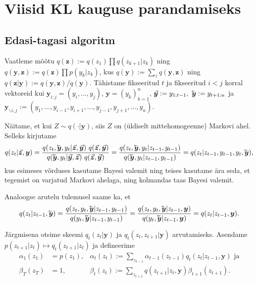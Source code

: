 
\section{Viisid KL kauguse parandamiseks}

\bla

\subsection{Edasi-tagasi algoritm}
\label{chapter:forw_back}

Vaatleme mõõtu $q(\bm{z}) := q(z_1) \prod q(z_{k+1} | z_k)$ ning $q(\bm{y},\bm{z}) := q(\bm{z}) \prod p(y_k | z_k)$, kus $q(\bm{y}) := \sum_{z} q(\bm{y},\bm{z})$ ning $q(\bm{z}|\bm{y}) := q(\bm{y},\bm{z})/q(\bm{y})$. Tähistame fikseeritud $t$ ja fikseeritud $i < j$ korral vektoreid kui $\bm{y}_{i:j} = (y_i,\ldots,y_j)$, $\bm{y} = (y_k)_{k=1}^n$, $\vec{\bm{y}} := y_{1:t-1},\ \cev{\bm{y}} := y_{t+1:n}$ ja $ \bm{y}_{\backslash i, j} := (y_1,\ldots,y_{i-1},y_{i+1},\ldots,y_{j-1},y_{j+1},\ldots,y_n)$.

Näitame, et kui $Z \sim q(\cdot | \bm{y})$, siis $Z$ on (üldiselt mittehomogeenne) Markovi ahel. Selleks kirjutame
$$q(z_{t} | \vec{\bm{z}}, \bm{y}) = \frac{q(z_t, \cev{\bm{y}}, y_t | \vec{\bm{z}}, \vec{\bm{y}}) \ q(\vec{\bm{z}}, \vec{\bm{y}})}{q(\cev{\bm{y}}, y_t | \vec{\bm{y}}, \vec{\bm{z}}) \ q(\vec{\bm{z}}, \vec{\bm{y}})} = \frac{q(z_t, \cev{\bm{y}}, y_t | z_{t-1}, y_{t-1})}{q(\cev{\bm{y}}, y_t | z_{t-1}, y_{t-1})} = q(z_t | z_{t-1}, y_{t-1},y_t, \cev{\bm{y}}),
$$
kus esimeses võrduses kasutame Bayesi valemit ning teises kasutame ära seda, et tegemist on varjatud Markovi ahelaga, ning kolmandas taas Bayesi valemit.

Analoogse arutelu tulemusel saame ka, et
\begin{equation}
    \label{eq:inhomog_markov}
    q(z_t | z_{t-1}, \cev{\bm{y}}) = \frac{q(z_t, y_t, \cev{\bm{y}} | z_{t-1}, y_{t-1})}{q(y_t, \cev{\bm{y}} | z_{t-1}, y_{t-1})} = \frac{q(z_t, y_t, \cev{\bm{y}} | z_{t-1}, \bm{y})}{q(y_t, \cev{\bm{y}} | z_{t-1}, \bm{y})} = q(z_{t} | z_{t-1}, \bm{y}).
\end{equation}

\vspace{0.5cm}
Järgmisena otsime skeemi $q_t(z_t | \bm{y})$ ja $q_t(z_t, z_{t+1} | \bm{y})$ arvutamiseks. Asendame $p(z_{t+1} | z_t) \mapsto q_t(z_{t+1}|z_{t})$ ja defineerime
\begin{align*}
    \alpha_1(z_1) &= p(z_1),& \alpha_{t}(z_{t}) := \sum_{z_{t-1}} \alpha_{t-1} (z_{t-1}) q_t(z_{t} | z_{t-1}, \bm{y}) \text{ ja} \\
    \beta_T(z_T) &= 1,& \beta_t (z_t) := \sum_{z_{t+1}} q(z_{t+1} | z_{t}, \bm{y})\beta_{t+1} (z_{t+1}).
\end{align*}

